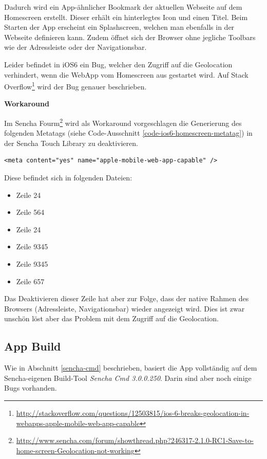 Dadurch wird ein App-ähnlicher Bookmark der aktuellen Webseite auf dem Homescreen erstellt.
Dieser erhält ein hinterlegtes Icon und einen Titel.
Beim Starten der App erscheint ein Splashscreen, welchen man ebenfalls in der Webseite definieren kann.
Zudem öffnet sich der Browser ohne jegliche Toolbars wie der Adressleiste oder der Navigationsbar.

Leider befindet in iOS6 ein Bug, welcher den Zugriff auf die Geolocation verhindert, wenn die \gls{WebApp} vom Homescreen aus gestartet wird.
Auf Stack Overflow\footnote{\url{http://stackoverflow.com/questions/12503815/ios-6-breaks-geolocation-in-webapps-apple-mobile-web-app-capable}} wird der Bug genauer beschrieben.

\textbf{Workaround}

Im Sencha Fourm\footnote{\url{http://www.sencha.com/forum/showthread.php?246317-2.1.0-RC1-Save-to-home-screen-Geolocation-not-working}} wird als Workaround vorgeschlagen die Generierung des folgenden Metatags (siehe Code-Ausschnitt \ref{code-ios6-homescreen-metatag}) in der Sencha Touch Library zu deaktivieren.

\lstset{language=HTML}
\begin{lstlisting}[caption=Metatag für iOS6 Workaround, label=code-ios6-homescreen-metatag]
<meta content="yes" name="apple-mobile-web-app-capable" />
\end{lstlisting}

Diese befindet sich in folgenden Dateien:

\begin{itemize}
\item {} Zeile 24
\item {} Zeile 564
\item {} Zeile 24
\item {} Zeile 9345
\item {} Zeile 9345
\item {} Zeile 657
\end{itemize}

Das Deaktivieren dieser Zeile hat aber zur Folge, dass der native Rahmen des Browsers (Adressleiste, Navigationsbar) wieder angezeigt wird.
Dies ist zwar unschön löst aber das Problem mit dem Zugriff auf die Geolocation.

\subsection{App Build}
Wie in Abschnitt \ref{sencha-cmd} beschrieben, basiert die App vollständig auf dem Sencha-eigenen Build-Tool \emph{Sencha Cmd 3.0.0.250}. Darin sind aber noch einige Bugs vorhanden.

